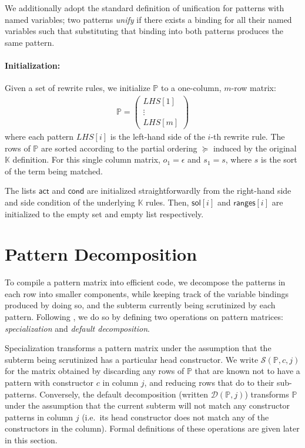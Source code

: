 \documentclass{article}
\theoremstyle{definition}
\newcommand{\K}{$\mathbb{K}$\xspace}
\newcommand{\cS}{\mathcal{S}}
\newcommand{\cD}{\mathcal{D}}
\newcommand{\sol}{\mathsf{sol}}
\newcommand{\actb}{\mathsf{act}}
\newcommand{\condb}{\mathsf{cond}}
\newcommand{\lslen}{\mathsf{ranges}}
\newcommand{\PP}{\mathbb{P}}
\begin{document}
We additionally adopt the standard definition of unification for patterns with
named variables; two patterns \emph{unify} if there exists a binding for all
their named variables such that substituting that binding into both patterns
produces the same pattern.

\paragraph{Initialization:} \label{sec:matrix-init}

Given a set of rewrite rules, we initialize $ \PP $ to a one-column,
$m$-row matrix:
\begin{align*}
  \PP =
  \begin{pmatrix}
    LHS[1] \\
    \vdots \\
    LHS[m]
  \end{pmatrix}
\end{align*}
where each pattern $ LHS[i] $ is the left-hand side of the $i$-th
rewrite rule. The rows of $ \PP $ are sorted according to the partial ordering $
\succeq $ induced by the original \K definition. For this single column matrix,
$ o_1 = \epsilon $ and $ s_1 = s $, where $ s $ is the sort of the term being
matched.

The lists $ \actb $ and $ \condb $ are initialized straightforwardly from the
right-hand side and side condition of the underlying \K rules. Then, $ \sol[i] $
and $ \lslen[i] $ are initialized to the empty set and empty list respectively.


\section{Pattern Decomposition} \label{sec:decomp}

To compile a pattern matrix into efficient code, we decompose the patterns in
each row into smaller components, while keeping track of the variable bindings
produced by doing so, and the subterm currently being scrutinized by each
pattern. Following \citet{Maranget2008}, we do so by defining two operations on
pattern matrices: \emph{specialization} and \emph{default decomposition}.

Specialization transforms a pattern matrix under the assumption that the subterm
being scrutinized has a particular head constructor. We write $ \cS(\PP, c, j) $
for the matrix obtained by discarding any rows of $ \PP $ that are known not to
have a pattern with constructor $ c $ in column $ j $, and reducing rows that do
to their sub-patterns. Conversely, the default decomposition (written $ \cD(\PP,
j) $) transforms $ \PP $ under the assumption that the current subterm will not
match any constructor patterns in column $ j $ (i.e.\ its head constructor does
not match any of the constructors in the column). Formal definitions of these
operations are given later in this section.
\end{document}
